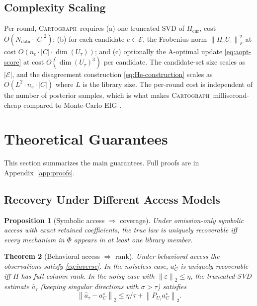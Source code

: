 \documentclass{article}
\newcommand{\method}{\textsc{Cartograph}}
\newcommand{\norm}[1]{\left\lVert #1 \right\rVert}
\theoremstyle{plain}
\newtheorem{theorem}{Theorem}[section]
\newtheorem{proposition}[theorem]{Proposition}
\theoremstyle{definition}
\theoremstyle{remark}
\begin{document}
\subsection{Complexity Scaling}
\label{sec:complexity}

Per round, \method\ requires (a) one truncated SVD of $H_{\mathrm{cur}}$,
cost $O(N_{\mathrm{data}}\cdot|C|^2)$; (b) for each candidate
$e\in\mathcal{E}$, the Frobenius norm $\norm{H_e U_\tau}_F^2$ at cost
$O(n_e\cdot|C|\cdot\dim(U_\tau))$; and (c) optionally the A-optimal update
\eqref{eq:aopt-score} at cost $O(\dim(U_\tau)^3)$ per candidate. The
candidate-set size scales as $|\mathcal{E}|$, and the disagreement
construction \eqref{eq:He-construction} scales as $O(L^2\cdot n_e\cdot|C|)$
where $L$ is the library size. The per-round cost is independent of the
number of posterior samples, which is what makes \method\ millisecond-cheap compared to
Monte-Carlo EIG \citep{foster2019variational,kleinegesse2020mine,blau2022rl,foster2021deep}.

\section{Theoretical Guarantees}

This section summarizes the main guarantees. Full proofs are in
Appendix~\ref{app:proofs}.

\subsection{Recovery Under Different Access Models}

\begin{proposition}[Symbolic access $\Rightarrow$ coverage]
\label{prop:coverage}
Under omission-only symbolic access with exact retained coefficients, the
true law is uniquely recoverable iff every mechanism in $\Phi$ appears in
at least one library member.
\end{proposition}

\begin{theorem}[Behavioral access $\Rightarrow$ rank]
\label{thm:rank}
Under behavioral access the observations satisfy \eqref{eq:inverse}. In the
noiseless case, $a^{\star}_C$ is uniquely recoverable iff $H$ has full
column rank. In the noisy case with $\norm{\varepsilon}_2\le\eta$, the
truncated-SVD estimate $\hat a_\tau$ (keeping singular directions with
$\sigma>\tau$) satisfies
\[
\norm{\hat a_\tau - a^{\star}_C}_2 \le \eta/\tau + \norm{P_{U_\tau}a^{\star}_C}_2.
\]
\end{theorem}
\end{document}
